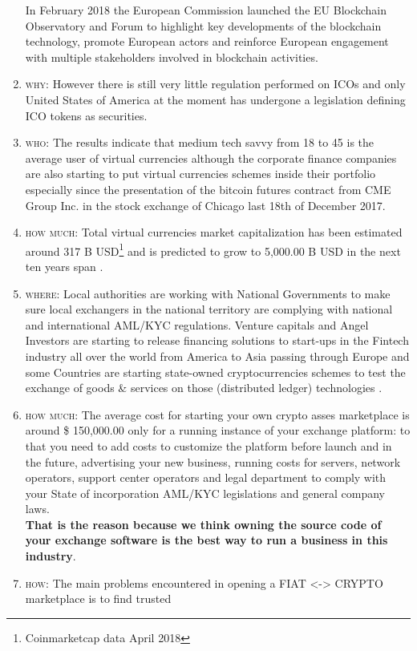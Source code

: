 \documentclass[11pt,fleqn,oneside]{book} %
\begin{document}
\begin{enumerate}
	In February 2018 the European Commission launched the EU Blockchain Observatory and Forum \cite{EUBOaF} to highlight key developments 
	of the blockchain technology, promote European actors and reinforce European engagement with multiple stakeholders involved in blockchain activities.
	\item \textsc{why}: However there is still very little regulation performed on ICOs and only United States of America at the moment has undergone
	a legislation defining ICO tokens as securities. \cite{SECICO}
	\item \textsc{who}: The results indicate that medium tech savvy from 18 to 45 is the average user of
	virtual currencies although the corporate finance companies are also starting to put 
	virtual currencies schemes inside their portfolio especially since the presentation 
	of the bitcoin futures contract from CME Group Inc. in the stock exchange of Chicago
	last 18th of December 2017.
	\item \textsc{how much}: Total virtual currencies market capitalization has been estimated around 317 B USD\footnote{Coinmarketcap data April 2018}
	and is predicted to grow to 5,000.00 B USD in the next ten years span \cite{cryptoMCTenYears}.
	\item \textsc{where}: Local authorities are working with National Governments to make sure local exchangers
	in the national territory are complying with national and international AML/KYC regulations.
	Venture capitals and Angel Investors are starting to release financing solutions to start-ups 
	in the Fintech industry all over the world from America to Asia passing through Europe and some 
	Countries are starting state-owned cryptocurrencies schemes to test the exchange of goods \& services
	on those (distributed ledger) technologies \cite{petro}.
	\item \textsc{how much}: The average cost for starting your own crypto asses marketplace is around \$ 150,000.00 only for a running instance of your exchange platform:
	to that you need to add costs to customize the platform before launch and in the future, advertising your new business, running costs for servers,
	network operators, support center operators and legal department to comply with your State of incorporation AML/KYC legislations and general company laws.\\
	\textbf{That is the reason because we think owning the source code of your exchange software is the best way to run a business in this industry}.
	\item \textsc{how}: The main problems encountered in opening a FIAT <-> CRYPTO marketplace is to find trusted

\end{enumerate}
\end{document}
